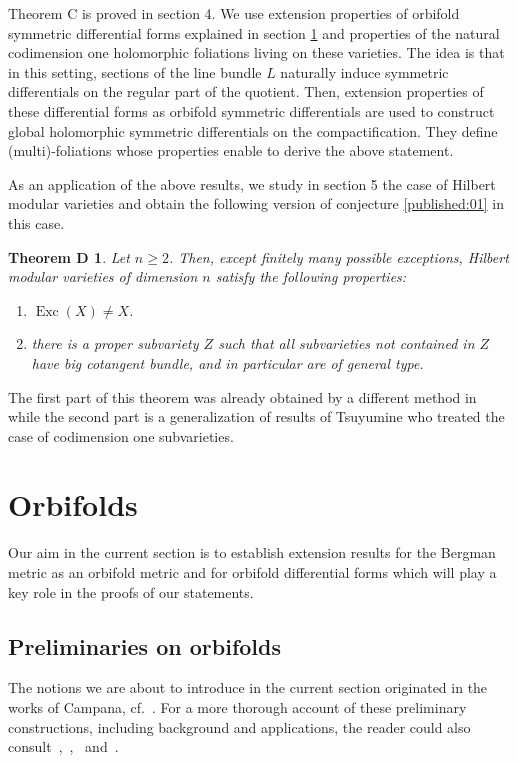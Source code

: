 \documentclass[10pt]{article}
\newtheorem*{thmd}{Theorem D}
\theoremstyle{definition}
\theoremstyle{remark}
\numberwithin{equation}{theorem}
\begin{document}
Theorem C is proved in section 4. We use extension properties of orbifold symmetric differential forms explained in section \ref{published:04} and properties of the natural codimension one holomorphic foliations living on these varieties. The idea is that in this setting, sections of the line bundle $L$ naturally induce symmetric differentials on the regular part of the quotient. Then, extension properties of these differential forms as orbifold symmetric differentials are used to construct global holomorphic symmetric differentials on the compactification. They define (multi)-foliations whose properties enable to derive the above statement.

As an application of the above results, we study in section 5 the case of Hilbert modular varieties and obtain the following version of conjecture \ref{published:01} in this case.

\begin{thmd}
Let $n \geqslant 2$. Then, except finitely many possible exceptions, Hilbert modular varieties of dimension $n$ satisfy the following properties:
\begin{enumerate}
\item $\operatorname{Exc}(X) \neq X$.
\item there is a proper subvariety $Z$ such that all subvarieties not contained in $Z$ have big cotangent bundle, and in particular are of general type.
\end{enumerate}
\end{thmd}


The first part of this theorem was already obtained by a different method in \cite{pubref27} while the second part is a generalization of results of Tsuyumine \cite{pubref30} who treated the case of codimension one subvarieties.


\section{Orbifolds}\label{published:04}

Our aim in the current section is to establish extension results for the Bergman metric as an orbifold metric and
for orbifold differential forms which will play a key role in the proofs of our statements. 

\subsection{Preliminaries on orbifolds}
 The notions we are about to introduce in the current section originated in the 
 works of Campana, cf.~\cite{pubref07}. For a more thorough account of these
 preliminary constructions, including background and applications, 
 the reader could also consult~\cite{pubref17},~\cite{pubref28},~\cite{pubref08} and~\cite{pubref15}.
 
\end{document}
